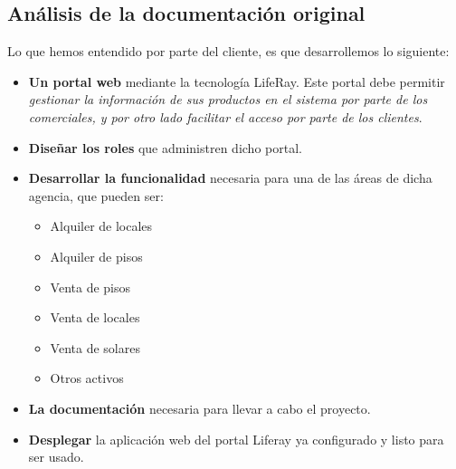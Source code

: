 \subsection{Análisis de la documentación original}
\par Lo que hemos entendido por parte del cliente, es que desarrollemos lo siguiente:
\begin{itemize}
	\item \textbf{Un portal web} mediante la tecnología LifeRay. Este portal debe permitir \textit{gestionar la información de sus productos en el sistema por parte de los
comerciales, y por otro lado facilitar el acceso por parte de los clientes}.
	\item \textbf{Diseñar los roles} que administren dicho portal.
	\item \textbf{Desarrollar la funcionalidad} necesaria para una de las áreas de dicha agencia, que pueden ser:
	\begin{itemize}
	 	\item Alquiler de locales
	 	\item Alquiler de pisos
	 	\item Venta de pisos
	 	\item Venta de locales
	 	\item Venta de solares
	 	\item Otros activos
	 \end{itemize}
	 \item \textbf{La documentación} necesaria para llevar a cabo el proyecto.
	 \item \textbf{Desplegar} la aplicación web del portal Liferay ya configurado y listo para ser usado.
\end{itemize}